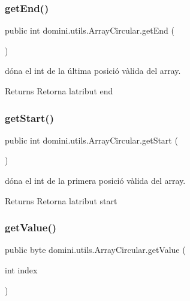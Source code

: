 \subsubsection{\texorpdfstring{get\+End()}{getEnd()}}
{\footnotesize\ttfamily public int domini.\+utils.\+Array\+Circular.\+get\+End (\begin{DoxyParamCaption}{ }\end{DoxyParamCaption})\hspace{0.3cm}{\ttfamily [inline]}}



dóna el int de la última posició vàlida del array. 

\begin{DoxyReturn}{Returns}
Retorna l\textquotesingle{}atribut end 
\end{DoxyReturn}
\mbox{\label{classdomini_1_1utils_1_1ArrayCircular_a3527e861f31137d21dd09e4fe452badd}} 
\subsubsection{\texorpdfstring{get\+Start()}{getStart()}}
{\footnotesize\ttfamily public int domini.\+utils.\+Array\+Circular.\+get\+Start (\begin{DoxyParamCaption}{ }\end{DoxyParamCaption})\hspace{0.3cm}{\ttfamily [inline]}}



dóna el int de la primera posició vàlida del array. 

\begin{DoxyReturn}{Returns}
Retorna l\textquotesingle{}atribut start 
\end{DoxyReturn}
\mbox{\label{classdomini_1_1utils_1_1ArrayCircular_acbed36ebcc550922c4485c19ce5be53e}} 
\subsubsection{\texorpdfstring{get\+Value()}{getValue()}}
{\footnotesize\ttfamily public byte domini.\+utils.\+Array\+Circular.\+get\+Value (\begin{DoxyParamCaption}\item[{int}]{index }\end{DoxyParamCaption})\hspace{0.3cm}{\ttfamily [inline]}}


